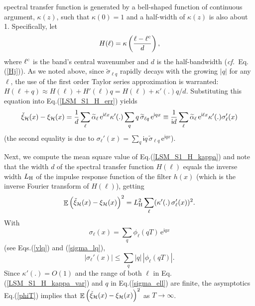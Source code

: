 \documentclass[12pt]{article}
\DeclareMathOperator{\Ex}{\mathbb{E}}
\newcommand{\cf}{{\em cf.\ }}
\newcommand{\e}{\mathrm{e}}
\renewcommand{\i}{\mathsf{i}}
\begin{document}
spectral transfer function is generated by a bell-shaped function of continuous argument, $\kappa(z)$, such that
$\kappa(0)=1$ and a  half-width of $\kappa(z)$ is also about 1.
Specifically, let
%
\begin {equation}
\label{H_kappa}
H(\ell) = \kappa \left(\frac{\ell-\ell^{\rm c}}{d} \right),
\end {equation}
%
where $\ell^{\rm c}$ is the band's central wavenumber and $d$ is the half-bandwidth
(\cf Eq.(\ref{Hj})).
As we noted above, since $\widetilde\sigma_{\ell q}$ rapidly decays with the growing $|q|$ for any $\ell$, 
the use of the first order Taylor series approximation is warranted:
$H(\ell+q) \approx H(\ell) + H'(\ell)q = H(\ell) + \kappa'(.) q/d$.
Substituting this equation into Eq.(\ref{LSM_S1_H_err}) yields
\begin {equation}
\label{LSM_S1_H_kappa}
\check\xi_{\cal H} (x)  - \xi_{\cal H} (x) =  \frac{1}{d}
   \sum_{\ell}  \widetilde\alpha_{\ell} \, \e^{\i \ell x}  \kappa'(.)
   \sum_{q} q \,\widetilde\sigma_{\ell q} \, \e^{\i  q x} \equiv
   \frac{1}{\i d} \sum_{\ell}  \widetilde\alpha_{\ell} \, \e^{\i \ell x}  \kappa'(.) \sigma_\ell'(x)
\end {equation}
%
(the second equality is due to  
$\sigma_\ell'(x) = \sum_{q}  \i q \,\widetilde\sigma_{\ell q} \, \e^{\i  q x}$).

Next, we compute the mean square value of Eq.(\ref{LSM_S1_H_kappa})
and note that the width $d$ of the spectral transfer function $H(\ell)$ equals the inverse width $L_{\rm H}$
of the impulse response function of the filter $h(x)$ (which is the inverse Fourier transform of $H(\ell)$),
getting
%
\begin {equation}
\label{LSM_S1_H_kappa_var}
\Ex\left( \check\xi_{\cal H} (x)  - \xi_{\cal H} (x)  \right)^2 = L_{\rm H}^2
   \sum_{\ell}  (\kappa'(.) \,\sigma_\ell'(x))^2.
\end {equation}
%
With
%
\begin {equation}
\label{sigma_ell}
\sigma_\ell(x) =\sum_q  \phi_\ell(qT) \, \e^{\i  q x}
\end {equation}
%
(see Eqs.(\ref{vlq}) and  (\ref{sigma_lq}),
%
\begin {equation}
\label{sigma_ell_prim}
|\sigma_\ell'(x)| \le  \sum_q  |q| \,  |\phi_\ell(qT)|.
\end {equation}
%
Since $ \kappa'(.) = O(1)$ and the range of both $\ell$ in Eq.(\ref{LSM_S1_H_kappa_var})
and $q$ in Eq.(\ref{sigma_ell}) are finite, the asymptotics Eq.(\ref{phiT})
implies that 
$\Ex\left( \check\xi_{\cal H} (x)  - \xi_{\cal H} (x)  \right)^2$
as 
$T \to \infty$.
\end{document}
